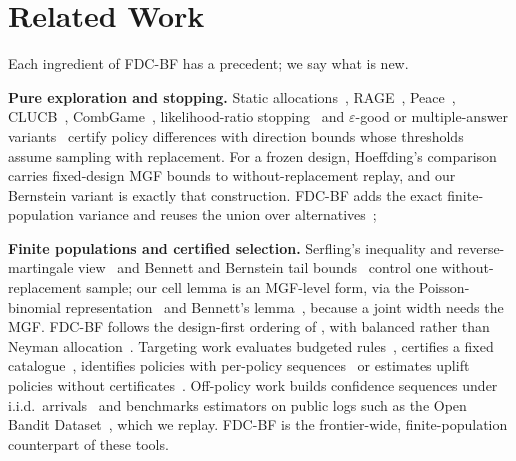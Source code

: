 \documentclass[sigconf,anonymous,review]{acmart}
\newcommand{\eps}{\varepsilon}
\begin{document}
\section{Related Work}\label{sec:related}

Each ingredient of FDC-BF has a precedent; we say what is new.

\textbf{Pure exploration and stopping.} Static allocations~\citep{soare2014best}, RAGE~\citep{fiez2019sequential}, Peace~\citep{katzsamuels2020empirical}, CLUCB~\citep{chen2014combinatorial,chen2017nearly}, CombGame~\citep{jourdan2021efficient}, likelihood-ratio stopping~\citep{garivier2016optimal} and $\eps$-good or multiple-answer variants~\citep{degenne2019pure,jourdan2022choosing,jamieson2018bandit} certify policy differences with direction bounds whose thresholds assume sampling with replacement. For a frozen design, Hoeffding's comparison~\citep{hoeffding1963probability} carries fixed-design MGF bounds to without-replacement replay, and our Bernstein variant is exactly that construction. FDC-BF adds the exact finite-population variance and reuses the union over alternatives~\citep{deheide2026union};

\textbf{Finite populations and certified selection.} Serfling's inequality and reverse-martingale view~\citep{serfling1974probability,bardenet2015concentration} and Bennett and Bernstein tail bounds~\citep{greene2017exponential} control one without-replacement sample; our cell lemma is an MGF-level form, via the Poisson-binomial representation~\citep{vatutin1982limit,tang2023poisson} and Bennett's lemma~\citep{bennett1962probability}, because a joint width needs the MGF. FDC-BF follows the design-first ordering of \citet{hait2026target}, with balanced rather than Neyman allocation~\citep{neyman1934two,kato2024generalized,dang2026target}. Targeting work evaluates budgeted rules~\citep{imai2023experimental,li2024neyman}, certifies a fixed catalogue~\citep{shekhar2026support}, identifies policies with per-policy sequences~\citep{molitor2026anytime} or estimates uplift policies without certificates~\citep{sverdrup2023qini,athey2021policy}. Off-policy work builds confidence sequences under i.i.d.\ arrivals~\citep{karampatziakis2021off,waudbysmith2024anytime,thomas2015high,cho2024cspimt} and benchmarks estimators on public logs such as the Open Bandit Dataset~\citep{saito2021open}, which we replay. FDC-BF is the frontier-wide, finite-population counterpart of these tools.
\end{document}

